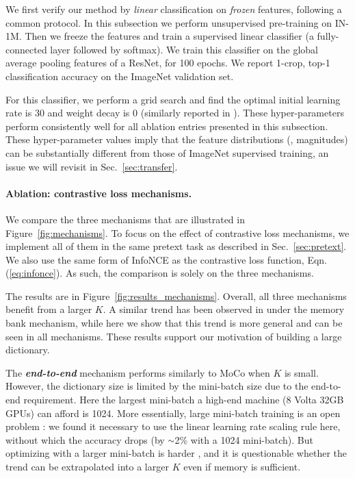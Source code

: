 \documentclass[10pt,twocolumn,letterpaper]{article}
\newcommand{\app}{\raise.17ex\hbox{$\scriptstyle\sim$}}
\begin{document}
We first verify our method by \emph{linear} classification on \emph{frozen} features, following a common protocol.
In this subsection we perform unsupervised pre-training on \mbox{IN-1M}. Then we freeze the features and train a supervised linear classifier (a fully-connected layer followed by softmax). We train this classifier on the global average pooling features of a ResNet, for 100 epochs. We report 1-crop, top-1 classification accuracy on the ImageNet validation set.

For this classifier, we perform a grid search and find the optimal initial learning rate is 30 and weight decay is 0 (similarly reported in \cite{Tian2019}).
These hyper-parameters perform consistently well for all ablation entries presented in this subsection. These hyper-parameter values imply that the feature distributions (\eg, magnitudes) can be substantially different from those of ImageNet supervised training, an issue we will revisit in Sec.~\ref{sec:transfer}.

\paragraph{Ablation: contrastive loss mechanisms.} We compare the three mechanisms that are illustrated in Figure~\ref{fig:mechanisms}. To focus on the effect of contrastive loss mechanisms, we implement all of them in the same pretext task as described in Sec.~\ref{sec:pretext}. We also use the same form of \mbox{InfoNCE} as the contrastive loss function, Eqn.(\ref{eq:infonce}). As such, the comparison is solely on the three mechanisms.

The results are in Figure~\ref{fig:results_mechanisms}.
Overall, all three mechanisms benefit from a larger $K$.
A similar trend has been observed in \cite{Wu2018a,Tian2019} under the memory bank mechanism, while here we show that this trend is more general and can be seen in all mechanisms. These results support our motivation of building a large dictionary.

The \emph{\textbf{end-to-end}} mechanism performs similarly to MoCo when $K$ is small. However, the dictionary size is limited by the mini-batch size due to the end-to-end requirement. Here the largest mini-batch a high-end machine (8 Volta 32GB GPUs) can afford is 1024. More essentially, large mini-batch training is an open problem \cite{Goyal2017}: we found it necessary to use the linear learning rate scaling rule \cite{Goyal2017} here, without which the accuracy drops (by $\app$2\% with a 1024 mini-batch). But optimizing with a larger mini-batch is harder \cite{Goyal2017}, and it is questionable whether the trend can be extrapolated into a larger $K$ even if memory is sufficient.
\end{document}
